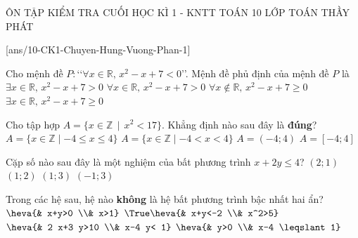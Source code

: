 \begin{name}
	{ÔN TẬP KIỂM TRA CUỐI HỌC KÌ 1 - KNTT}
	{TOÁN 10}
	{LỚP TOÁN THẦY PHÁT}
	{\thoigian}
\end{name}

\caulc
{}[ans/10-CK1-Chuyen-Hung-Vuong-Phan-1]


\begin{ex}%
	Cho mệnh đề $P\colon$\lq\lq $\forall x\in \mathbb{R},\, x^2-x+7< 0$\rq\rq. Mệnh đề phủ định của mệnh đề $P$ là
	\choice 
	{$\exists x\in \mathbb{R},\,x^2-x+7>0$}
	{$\forall x\in \mathbb{R},\,x^2-x+7>0$} 
	{$\forall x\notin \mathbb{R},\,x^2-x+7\ge 0$}
	{\True $\exists x\in \mathbb{R},\,x^2-x+7\ge 0$} 
\end{ex}

\begin{ex}%
	Cho tập hợp $A= \{x \in \mathbb{Z}\, \mid \, x^2<17 \} $. Khẳng định nào sau đây là \textbf{đúng}?
	\choice
	{\True $A= \{ x \in \mathbb{Z} \mid -4 \le x \le 4 \} $}
	{$A= \{ x \in \mathbb{Z} \mid -4 < x < 4 \} $}
	{$A=(-4;4) $}
	{$A= [-4;4] $}
\end{ex}


\begin{ex}%
	Cặp số nào sau đây là một nghiệm của bất phương trình $x + 2y \le 4$?
	\choice
	{\True $(2; 1)$}
	{$(1; 2)$}
	{$(1; 3)$}
	{$(-1; 3)$}
\end{ex}

\begin{ex}%
	Trong các hệ sau,  hệ nào \textbf{không} là hệ bất phương trình bậc nhất hai ẩn?
	\choice
	{$ \heva{& x+y>0  \\&  x>1}$}
	{\True $\True \heva{& x+y<-2  \\&  x^2>5}$}
	{$ \heva{& 2 x+3 y>10  \\&  x-4 y< 1}$}
	{$ \heva{& y>0  \\&  x-4 \leqslant 1}$}
\end{ex}

